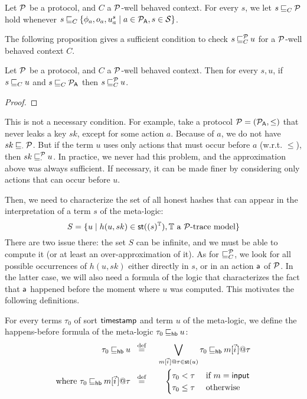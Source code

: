 \begin{definition}
  Let $\mathcal{P}$ be a protocol, and $C$ a $\mathcal{P}$-well behaved context. For every $s$, we let $s \mathbin{\sqsubseteq}_{C} \mathcal{P}$ hold whenever $s \mathbin{\sqsubseteq}_{C} \{\phi_a,o_a,u^s_a \mid a \in \mathcal{P}_{\textsf{A}}, s \in\mathcal{S}\}$.
\end{definition}

The following proposition gives a sufficient condition to check $s \mathbin{\sqsubseteq}^{\mathcal{P}}_{C} u$ for a $\mathcal{P}$-well behaved context $C$.

\begin{proposition}
  Let $\mathcal{P}$ be a protocol, and $C$ a $\mathcal{P}$-well behaved context. Then for every $s,u$, if $s \mathbin{\sqsubseteq}_{C} u$ and $s \mathbin{\sqsubseteq}_{C} \mathcal{P}_{\textsf{A}}$ then $s \mathbin{\sqsubseteq}^{\mathcal{P}}_{C} u$.
\end{proposition}

\begin{proof}
\end{proof}

\begin{remark}
  This is not a necessary condition. For example, take a protocol $\mathcal{P} = (\mathcal{P}_{\textsf{A}},\le)$ that never leaks a key $sk$, except for some action $a$. Because of $a$, we do not have $sk \mathbin{\sqsubseteq}_{\cdot} \mathcal{P}$. But if the term $u$ uses only actions that must occur before $a$ (w.r.t. $\le$), then $sk \mathbin{\sqsubseteq}^{\mathcal{P}}_{\cdot} u$. In practice, we never had this problem, and the approximation above was always sufficient. If necessary, it can be made finer by considering only actions that can occur before $u$.
\end{remark}

Then, we need to characterize the set of all honest hashes that can appear in the interpretation of a term $s$ of the meta-logic:
\[
  S = \{u \mid h(u,sk) \in \mathsf{st}((s)^{\mathbb{T}}),
  \mathbb{T} \text{ a $\mathcal{P}$-trace model}\}
\]
There are two issue there: the set $S$ can be infinite, and we must be able to compute it (or at least an over-approximation of it). As for $\mathbin{\sqsubseteq}^{\mathcal{P}}_{C}$, we look for all possible occurrences of $h(u,sk)$ either directly in $s$, or in an action $\textsf{a}$ of $\mathcal{P}$. In the latter case, we will also need a formula of the logic that characterizes the fact that $\textsf{a}$ happened before the moment where $u$ was computed. This motivates the following definitions.

\begin{definition}
  For every terms $\tau_0$ of sort $\textsf{timestamp}$ and term $u$ of the meta-logic, we define the happens-before formula of the meta-logic $\tau_0 \mathbin{\sqsubseteq_{\textsf{hb}}} u$:
  \begin{alignat*}{2}
    \tau_0 \lehb u &\;\;\overset{\text{def}}{=}\;\;&
    \bigvee_{m[\pvec{i}]@\tau \in \st(u)}
    \tau_0 \lehb m[\pvec{i}]@\tau\\
    \text{where }\tau_0 \lehb m[\pvec{i}]@\tau  &\;\;\overset{\text{def}}{=}\;\;&
    \begin{cases}
      \tau_0 < \tau &\text{ if } m = \minp\\
      \tau_0 \le \tau &\text{ otherwise}
    \end{cases}
  \end{alignat*} 
\end{definition}

